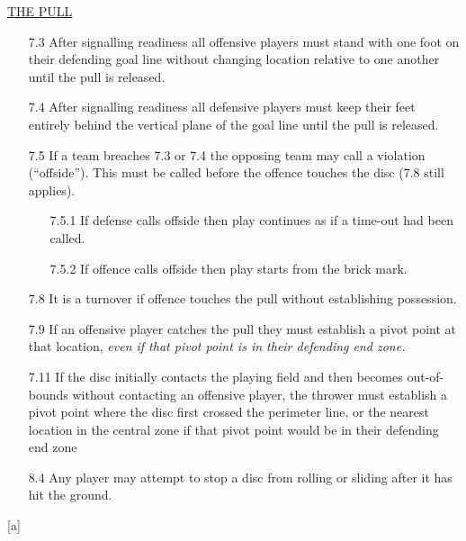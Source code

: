 \underline{\uppercase{the pull}}
\begin{itemize}[noitemsep]
\tiny
    \item [7.3] After signalling readiness all offensive players must stand with one foot on their defending goal line without changing location relative to one another until the pull is released.
    \item [7.4] After signalling readiness all defensive players must keep their feet entirely behind the vertical plane of the goal line until the pull is released.
    \item [7.5] If a team breaches 7.3 or 7.4 the opposing team may call a violation (“offside”). This must be called before the offence touches the disc (7.8 still applies).
        \begin{itemize}
            \item[7.5.1] If defense calls offside then play continues as if a time-out had been called. 
            \item[7.5.2] If offence calls offside then play starts from the brick mark.
        \end{itemize}
    \item[7.8] It is a turnover if offence touches the pull without establishing possession.
    \item[7.9] If an offensive player catches the pull they must establish a pivot point at that location, \textit{even if that pivot point is in their defending end zone.}
    \item[7.11] If the disc initially contacts the playing field and then becomes out-of-bounds without contacting an offensive player, the thrower must establish a pivot point where the disc first crossed the perimeter line, or the nearest location in the central zone if that pivot point would be in their defending end zone
    \item[8.4] Any player may attempt to stop a disc from rolling or sliding after it has hit the ground.
\end{itemize}
\vspace*{-0.5cm}
\begin{center}[a]\end{center}
